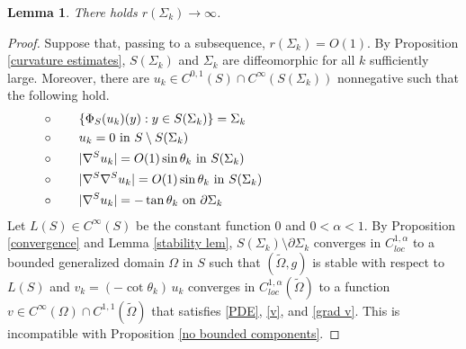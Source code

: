 \documentclass[11pt]{amsart}
\newtheorem{lem}[prop]{Lemma}
\begin{document}
\begin{lem} \label{divergence}
	There holds $r(\Sigma_k)\to \infty$.

\end{lem} 
\begin{proof}
	Suppose that, passing to a subsequence, $r(\Sigma_k)=O(1)$.
By Proposition \ref{curvature estimates},  $S(\Sigma_k)$ and $\Sigma_k$ are diffeomorphic for all $k$ sufficiently large. Moreover, there are 	$ u_k\in C^{0,1}(S)\cap C^\infty(S(\Sigma_k))$ nonnegative such that the following hold.
	\begin{equation*}
		\begin{aligned}
			&\circ\qquad \text{$ \{\Phi_{S}(u_k)(y):y\in S(\Sigma_k)\}$}= \Sigma_k\hspace{5cm}\\ 		
			&\circ\qquad \text{$u_k=0$ in $S\setminus S(\Sigma_k)$} \\
			&\circ\qquad \text{$|\nabla^{S} u_k|=O(1) \sin\theta_k$ in $ S(\Sigma_k)$}\\ 
						&\circ\qquad \text{$|\nabla^{S}\nabla^{S} u_k|=O(1)\sin\theta_k$ in $ S(\Sigma_k)$}\\
			&\circ\qquad \text{$|\nabla^{S} u_k|=-\tan\theta_k$ on $ \partial \Sigma_k $}
		\end{aligned}
	\end{equation*} 
	Let $L(S)\in C^\infty(S)$ be the constant function $0$ and $0<\alpha<1$. By Proposition \ref{convergence} and Lemma \ref{stability lem}, $S(\Sigma_k)\setminus \partial \Sigma_k$ converges in $C_{loc}^{1,\alpha}$  to a bounded generalized domain $\Omega$ in $S$ such that $(\tilde \Omega,g)$  is stable with respect to $L(S)$ and $v_k=(-\cot\theta_k)\,u_k$ converges  in $C_{loc}^{1,\alpha}(\tilde \Omega)$ to a function $v\in C^\infty(\Omega)\cap C^{1,1}(\tilde \Omega)$ that satisfies \eqref{PDE}, \eqref{v}, and \eqref{grad v}. This is incompatible with Proposition \ref{no bounded components}. 
\end{proof}
\end{document}
